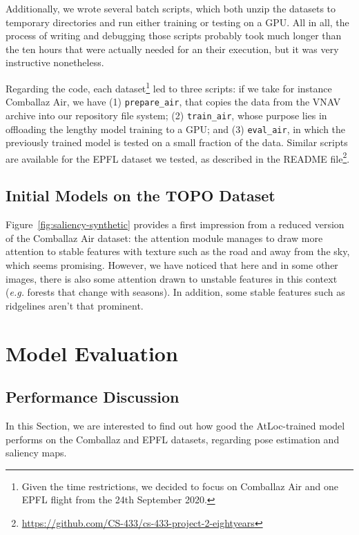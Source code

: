 \documentclass[10pt,conference,compsocconf]{IEEEtran}
\begin{document}
Additionally, we wrote several batch scripts, which both unzip the datasets to temporary directories and run either training or testing on a GPU. All in all, the process of writing and debugging those scripts probably took much longer than the ten hours that were actually needed for an their execution, but it was very instructive nonetheless.

Regarding the code, each dataset\footnote{Given the time restrictions, we decided to focus on Comballaz Air and one EPFL flight from the 24th September 2020.} led to three scripts: if we take for instance Comballaz Air, we have (1) \texttt{prepare\_air}, that copies the data from the VNAV archive into our repository file system; (2) \texttt{train\_air}, whose purpose lies in offloading the lengthy model training to a GPU; and (3) \texttt{eval\_air}, in which the previously trained model is tested on a small fraction of the data. Similar scripts are available for the EPFL dataset we tested, as described in the README file\footnote{\url{https://github.com/CS-433/cs-433-project-2-eightyears}}.


\subsection{Initial Models on the TOPO Dataset}

Figure~\ref{fig:saliency-synthetic} provides a first impression from a reduced version of the Comballaz Air dataset: the attention module manages to draw more attention to stable features with texture such as the road and away from the sky, which seems promising. However, we have noticed that here and in some other images, there is also some attention drawn to unstable features in this context (\emph{e.g.} forests that change with seasons). In addition, some stable features such as ridgelines aren't that prominent.


\section{Model Evaluation}

\subsection{Performance Discussion}

In this Section, we are interested to find out how good the AtLoc-trained model performs on the Comballaz and EPFL datasets, regarding pose estimation and saliency maps.
 
\end{document}

